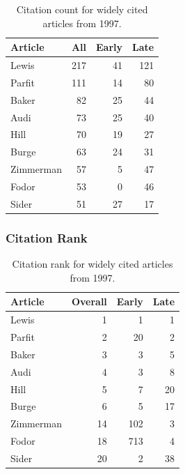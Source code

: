 \documentclass[
  10pt,
  letterpaper,
  DIV=11,
  numbers=noendperiod,
  twoside]{scrartcl}
\begin{document}
\begin{longtable}[]{@{}lrrr@{}}

\caption{\label{tbl-citation-count-1997}Citation count for widely cited
articles from 1997.}

\tabularnewline

\toprule\noalign{}
Article & All & Early & Late \\
\midrule\noalign{}
\endhead
\bottomrule\noalign{}
\endlastfoot
Lewis & 217 & 41 & 121 \\
Parfit & 111 & 14 & 80 \\
Baker & 82 & 25 & 44 \\
Audi & 73 & 25 & 40 \\
Hill & 70 & 19 & 27 \\
Burge & 63 & 24 & 31 \\
Zimmerman & 57 & 5 & 47 \\
Fodor & 53 & 0 & 46 \\
Sider & 51 & 27 & 17 \\

\end{longtable}

\subsubsection*{Citation Rank}\label{citation-rank-21}

\begin{longtable}[]{@{}lrrr@{}}

\caption{\label{tbl-citation-rank-1997}Citation rank for widely cited
articles from 1997.}

\tabularnewline

\toprule\noalign{}
Article & Overall & Early & Late \\
\midrule\noalign{}
\endhead
\bottomrule\noalign{}
\endlastfoot
Lewis & 1 & 1 & 1 \\
Parfit & 2 & 20 & 2 \\
Baker & 3 & 3 & 5 \\
Audi & 4 & 3 & 8 \\
Hill & 5 & 7 & 20 \\
Burge & 6 & 5 & 17 \\
Zimmerman & 14 & 102 & 3 \\
Fodor & 18 & 713 & 4 \\
Sider & 20 & 2 & 38 \\

\end{longtable}
\end{document}
